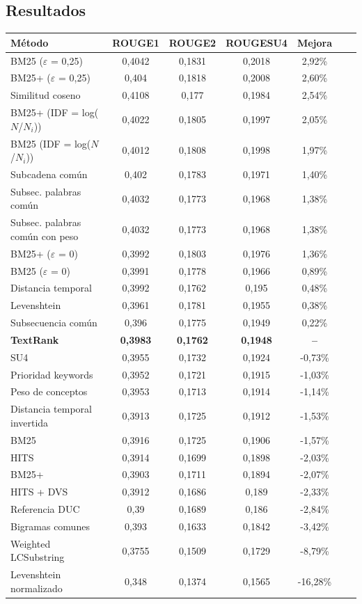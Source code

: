 \documentclass[a4paper]{article}
\begin{document}
\subsection{Resultados}
\begin{tabular}{l*{5}{c}r}
    \hline
    \rule{0pt}{12pt}
	Método & ROUGE1 & ROUGE2 & ROUGESU4 & Mejora \\[2pt]
    \hline\rule{0pt}{12pt}\mbox{}\par\nobreak
	BM25 ($\varepsilon$ = 0,25) & 0,4042 & 0,1831 & 0,2018 & 2,92\% \\ 
	BM25+ ($\varepsilon$ = 0,25) & 0,404 & 0,1818 & 0,2008 & 2,60\% \\ 
	Similitud coseno & 0,4108 & 0,177 & 0,1984 & 2,54\% \\ 
	BM25+ (IDF = log($N$/$N_i$)) & 0,4022 & 0,1805 & 0,1997 & 2,05\% \\ 
	BM25 (IDF = log($N$/$N_i$)) & 0,4012 & 0,1808 & 0,1998 & 1,97\% \\ 
	Subcadena común & 0,402 & 0,1783 & 0,1971 & 1,40\% \\
	Subsec. palabras común & 0,4032 & 0,1773 & 0,1968 & 1,38\% \\ 
	Subsec. palabras común con peso & 0,4032 & 0,1773 & 0,1968 & 1,38\% \\ 
	BM25+ ($\varepsilon$ = 0) & 0,3992 & 0,1803 & 0,1976 & 1,36\% \\ 
	BM25 ($\varepsilon$ = 0) & 0,3991 & 0,1778 & 0,1966 & 0,89\% \\ 
	Distancia temporal & 0,3992 & 0,1762 & 0,195 & 0,48\% \\ 
	Levenshtein & 0,3961 & 0,1781 & 0,1955 & 0,38\% \\ 
	Subsecuencia común & 0,396 & 0,1775 & 0,1949 & 0,22\% \\ 
    \textbf{TextRank} & \textbf{0,3983} & \textbf{0,1762} & \textbf{0,1948} & \textbf{--} \\
	SU4 & 0,3955 & 0,1732 & 0,1924 & -0,73\% \\ 
	Prioridad keywords & 0,3952 & 0,1721 & 0,1915 & -1,03\% \\
	Peso de conceptos & 0,3953 & 0,1713 & 0,1914 & -1,14\% \\
	Distancia temporal invertida & 0,3913 & 0,1725 & 0,1912 & -1,53\% \\
	BM25 & 0,3916 & 0,1725 & 0,1906 & -1,57\% \\
	HITS & 0,3914 & 0,1699 & 0,1898 & -2,03\% \\
	BM25+ & 0,3903 & 0,1711 & 0,1894 & -2,07\% \\
	HITS + DVS & 0,3912 & 0,1686 & 0,189 & -2,33\% \\
	Referencia DUC & 0,39 & 0,1689 & 0,186 & -2,84\% \\
	Bigramas comunes & 0,393 & 0,1633 & 0,1842 & -3,42\% \\
	Weighted LCSubstring & 0,3755 & 0,1509 & 0,1729 & -8,79\% \\
	Levenshtein normalizado & 0,348 & 0,1374 & 0,1565 & -16,28\% \\
\end{tabular}

\newpage
{}

\end{document}
